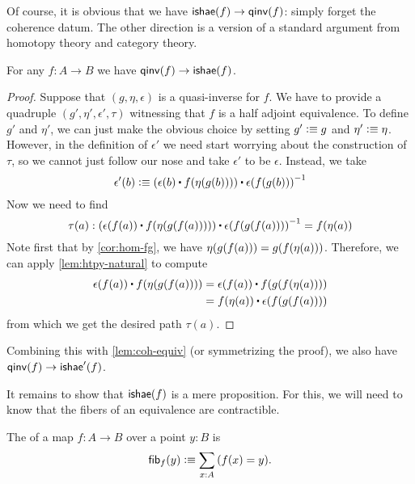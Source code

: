 Of course, it is obvious that we have $\mathsf{ishae}(f) \to\mathsf{qinv}(f)$: simply forget the coherence datum.
The other direction is a version of a standard argument from homotopy theory and category theory.

\begin{thm}\label{thm:equiv-iso-adj}
  For any $f:A\to B$ we have $\mathsf{qinv}(f)\to\mathsf{ishae}(f)$.
\end{thm}
\begin{proof}
Suppose that $(g,\eta,\epsilon)$ is a quasi-inverse for $f$. We have to provide
a quadruple $(g',\eta',\epsilon',\tau)$ witnessing that $f$ is a half adjoint equivalence. To
define $g'$ and $\eta'$, we can just make the obvious choice by setting $g'
\vcentcolon\equiv g$ and $\eta'\vcentcolon\equiv \eta$. However, in the definition of $\epsilon'$ we
need start worrying about the construction of $\tau$, so we cannot just follow our nose
and take $\epsilon'$ to be $\epsilon$. Instead, we take
\begin{equation*}
\epsilon'(b) \defeq (\epsilon(b)\ct \ap{f}{\eta(g(b))})\ct \opp{\epsilon(f(g(b)))}
\end{equation*}
Now we need to find
\begin{equation*}
\tau(a):(\epsilon(f(a))\ct \ap{f}{\eta(g(f(a)))})\ct \opp{\epsilon(f(g(f(a))))}=\ap{f}{\eta(a)}
\end{equation*}
Note first that by \autoref{cor:hom-fg}, we have 
$\eta(g(f(a)))={g}\mathopen{}\left({{f}\mathopen{}\left({\eta(a)}\right)\mathclose{}}\right)\mathclose{}$. Therefore, we can apply
\autoref{lem:htpy-natural} to compute
\begin{align*}
\epsilon(f(a))\ct \ap{f}{\eta(g(f(a)))}
& = \epsilon(f(a))\ct \ap{f}{\ap{g}{\ap{f}{\eta(a)}}}\\
& = \ap{f}{\eta(a)}\ct\epsilon(f(g(f(a))))
\end{align*}
from which we get the desired path $\tau(a)$.
\end{proof}

Combining this with \autoref{lem:coh-equiv} (or symmetrizing the proof), we also have $\mathsf{qinv}(f)\to\mathsf{ishae}'(f)$.

It remains to show that $\mathsf{ishae}(f)$ is a mere proposition.
For this, we will need to know that the fibers of an equivalence are contractible.

\begin{defn}\label{defn:homotopy-fiber}
  The 
  of a map $f:A\to B$ over a point $y:B$ is
  \[ \hfib f y \defeq \sm{x:A} (f(x) = y).\]
\end{defn}

